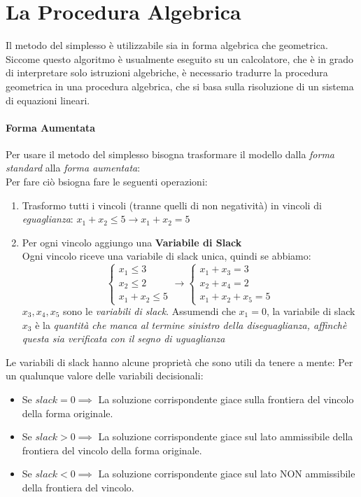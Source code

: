 \documentclass[12pt, a4paper, openany]{book}
\begin{document}
\section{La Procedura Algebrica}
Il metodo del simplesso è utilizzabile sia in forma algebrica che geometrica.
Siccome questo algoritmo è usualmente eseguito su un calcolatore, che è in grado di interpretare solo istruzioni algebriche,
è necessario tradurre la procedura geometrica in una procedura algebrica, che si basa sulla risoluzione di un sistema di equazioni lineari.
\paragraph*{Forma Aumentata}
Per usare il metodo del simplesso bisogna trasformare il modello dalla \emph{forma standard} alla \emph{forma aumentata}:
\\Per fare ciò bsiogna fare le seguenti operazioni:
\begin{enumerate}
    \item Trasformo tutti i vincoli (tranne quelli di non negatività) in vincoli di \emph{eguaglianza}:
    $ x_1 +  x_2 \leq 5 \to  x_1 + x_2 = 5$ 
    \item Per ogni vincolo aggiungo una \textbf{Variabile di Slack}
    \\Ogni vincolo riceve una variabile di slack unica, quindi se abbiamo:
    \[
        \begin{cases}
            x_1 \leq 3 \\
            x_2 \leq 2 \\
            x_1 + x_2 \leq 5
        \end{cases}
        \to
        \begin{cases}
            x_1 + x_3 = 3 \\
            x_2 + x_4= 2 \\
            x_1 + x_2 + x_5 = 5 
        \end{cases}
    \]
    $x_3,x_4,x_5$ sono le \emph{variabili di slack}.
    Assumendi che $x_1 = 0$, la variabile di slack $x_3$ è la \emph{quantità che manca al termine sinistro della diseguaglianza,
    affinchè questa sia verificata con il segno di uguaglianza }
\end{enumerate}
Le variabili di slack hanno alcune proprietà che sono utili da tenere a mente: 
Per un qualunque valore delle variabili decisionali:
\begin{itemize}
    \item Se $slack = 0 \implies$ La soluzione corrispondente giace sulla frontiera del vincolo della forma originale.
    \item Se $slack > 0 \implies$ La soluzione corrispondente giace sul lato ammissibile della frontiera del vincolo della forma originale.
    \item Se $slack < 0 \implies$ La soluzione corrispondente giace sul lato NON ammissibile della frontiera del vincolo.
\end{itemize}
\end{document}
